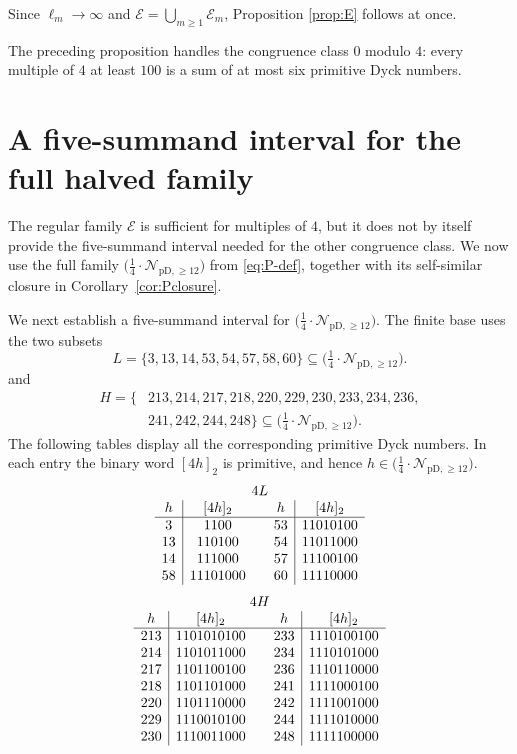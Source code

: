 \documentclass[12pt]{article}
\theoremstyle{plain}
\theoremstyle{definition}
\theoremstyle{plain}
\newcommand{\Pset}{%
  \bigl(\tfrac{1}{4}\cdot\mathcal{N}_{\mathrm{pD},\geq 12}\bigr)%
}
\begin{document}
Since $\ell_{m}\to\infty$ and $\mathcal E=\bigcup_{m\geq1}\mathcal E_{m}$,
Proposition \ref{prop:E} follows at once.

The preceding proposition handles the congruence class $0$ modulo
$4$: every multiple of $4$ at least $100$ is a sum of at most six
primitive Dyck numbers.

\section{A five-summand interval for the full halved family}
\label{sec:five-interval}

The regular family $\mathcal E$ is sufficient for multiples of $4$, but it
does not by itself provide the five-summand interval needed for the other
congruence class.  We now use the full family $\Pset$ from
\eqref{eq:P-def}, together with its self-similar closure in
Corollary~\ref{cor:Pclosure}.

We next establish a five-summand interval for $\Pset$.  The finite base
uses the two subsets
\begin{equation}\label{eq:L-def}
 L=\{3,13,14,53,54,57,58,60\}\subseteq\Pset.
\end{equation}
and
\begin{equation}\label{eq:H-def}
\begin{split}
 H=\{&213,214,217,218,220,229,230,233,234,236,\\
     &241,242,244,248\}\subseteq\Pset.
\end{split}
\end{equation}
The following tables display all the corresponding primitive Dyck
numbers.  In each entry the binary word $[4h]_2$ is primitive, and hence
$h\in\Pset$.
\[
\begin{array}{c|c@{\qquad}c|c}
\multicolumn{4}{c}{4L}\\
h&[4h]_2&h&[4h]_2\\ \hline
3&1100&53&11010100\\
13&110100&54&11011000\\
14&111000&57&11100100\\
58&11101000&60&11110000
\end{array}
\]
\[
\begin{array}{c|c@{\qquad}c|c}
\multicolumn{4}{c}{4H}\\
h&[4h]_2&h&[4h]_2\\ \hline
213&1101010100&233&1110100100\\
214&1101011000&234&1110101000\\
217&1101100100&236&1110110000\\
218&1101101000&241&1111000100\\
220&1101110000&242&1111001000\\
229&1110010100&244&1111010000\\
230&1110011000&248&1111100000
\end{array}
\]
\end{document}
